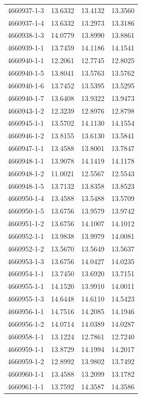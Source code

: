 \begin{longtable}{lrrr}
4660937-1-3 & 13.6332 & 13.4132 & 13.3560 \\
4660937-1-4 & 13.6332 & 13.2973 & 13.3186 \\
4660938-1-3 & 14.0779 & 13.8990 & 13.8861 \\
4660939-1-1 & 13.7459 & 14.1186 & 14.1541 \\
4660940-1-1 & 12.2061 & 12.7745 & 12.8025 \\
4660940-1-5 & 13.8041 & 13.5763 & 13.5762 \\
4660940-1-6 & 13.7452 & 13.5395 & 13.5295 \\
4660940-1-7 & 13.6408 & 13.9322 & 13.9473 \\
4660943-1-2 & 12.3239 & 12.8976 & 12.8798 \\
4660945-1-1 & 13.5702 & 14.1130 & 14.1554 \\
4660946-1-2 & 13.8155 & 13.6130 & 13.5841 \\
4660947-1-1 & 13.4588 & 13.8001 & 13.7847 \\
4660948-1-1 & 13.9078 & 14.1419 & 14.1178 \\
4660948-1-2 & 11.0021 & 12.5567 & 12.5543 \\
4660948-1-5 & 13.7132 & 13.8358 & 13.8523 \\
4660950-1-4 & 13.4588 & 13.5488 & 13.5709 \\
4660950-1-5 & 13.6756 & 13.9579 & 13.9742 \\
4660951-1-2 & 13.6756 & 14.1007 & 14.1012 \\
4660952-1-1 & 13.9838 & 13.9979 & 14.0081 \\
4660952-1-2 & 13.5670 & 13.5649 & 13.5637 \\
4660953-1-3 & 13.6756 & 14.0427 & 14.0235 \\
4660954-1-1 & 13.7450 & 13.6920 & 13.7151 \\
4660955-1-1 & 14.1520 & 13.9910 & 14.0011 \\
4660955-1-3 & 14.6448 & 14.6110 & 14.5423 \\
4660956-1-1 & 14.7516 & 14.2085 & 14.1946 \\
4660956-1-2 & 14.0714 & 14.0389 & 14.0287 \\
4660958-1-1 & 13.1224 & 12.7861 & 12.7240 \\
4660959-1-1 & 13.8729 & 14.1994 & 14.2017 \\
4660959-1-2 & 12.8992 & 13.9802 & 13.7492 \\
4660960-1-1 & 13.4588 & 13.2099 & 13.1782 \\
4660961-1-1 & 13.7592 & 14.3587 & 14.3586 \\

\end{longtable}
